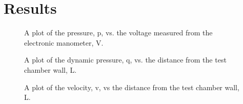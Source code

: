 \chapter{Results}
\label{cp:results}

\begin{figure}[htpb]
    \centering
    
    \caption[Plot of pressure vs. voltage measured from the electronic manometer.]{A plot of the pressure, \gls{p}, vs. the voltage measured from the electronic manometer, \gls{V}.}
    \label{fig:pressure_vs_voltage}
\end{figure}

\begin{figure}[htpb]
    \centering
    
    \caption[Plot of dynamic pressure vs. the distance from the test chamber wall.]{A plot of the dynamic pressure, \gls{q}, vs. the distance from the test chamber wall, \gls{L}.}
    \label{fig:dynamic_pressure_vs_distance}
\end{figure}

\begin{figure}[htpb]
    \centering
    
    \caption[Plot of velocity vs. the distance from the test chamber wall.]{A plot of the velocity, \gls{v}, vs the distance from the test chamber wall, \gls{L}.}
    \label{fig:velocity_vs_distance}
\end{figure}